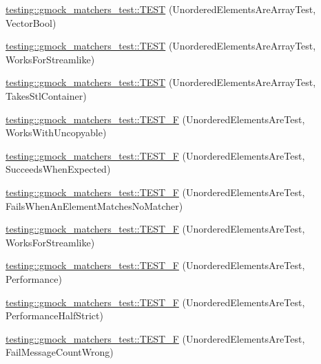 \begin{DoxyCompactItemize}
\item 
\hyperlink{namespacetesting_1_1gmock__matchers__test_a3d7df4fa0dd3e8247f4c2d4b02d801f0}{testing\+::gmock\+\_\+matchers\+\_\+test\+::\+T\+E\+ST} (Unordered\+Elements\+Are\+Array\+Test, Vector\+Bool)
\item 
\hyperlink{namespacetesting_1_1gmock__matchers__test_a1ff2a93a8f031a5b23dbc699a462043b}{testing\+::gmock\+\_\+matchers\+\_\+test\+::\+T\+E\+ST} (Unordered\+Elements\+Are\+Array\+Test, Works\+For\+Streamlike)
\item 
\hyperlink{namespacetesting_1_1gmock__matchers__test_aa3a960ec78e2b1e860c305f4598f39ec}{testing\+::gmock\+\_\+matchers\+\_\+test\+::\+T\+E\+ST} (Unordered\+Elements\+Are\+Array\+Test, Takes\+Stl\+Container)
\item 
\hyperlink{namespacetesting_1_1gmock__matchers__test_ab09132c3b991b8f104f3091370d2fe55}{testing\+::gmock\+\_\+matchers\+\_\+test\+::\+T\+E\+S\+T\+\_\+F} (Unordered\+Elements\+Are\+Test, Works\+With\+Uncopyable)
\item 
\hyperlink{namespacetesting_1_1gmock__matchers__test_a177c3db59da001df2441deb1ddb083af}{testing\+::gmock\+\_\+matchers\+\_\+test\+::\+T\+E\+S\+T\+\_\+F} (Unordered\+Elements\+Are\+Test, Succeeds\+When\+Expected)
\item 
\hyperlink{namespacetesting_1_1gmock__matchers__test_a62fd481b1160a667c785e6009ff87163}{testing\+::gmock\+\_\+matchers\+\_\+test\+::\+T\+E\+S\+T\+\_\+F} (Unordered\+Elements\+Are\+Test, Fails\+When\+An\+Element\+Matches\+No\+Matcher)
\item 
\hyperlink{namespacetesting_1_1gmock__matchers__test_a2affca2a152e4537c2f06518eaa2eac5}{testing\+::gmock\+\_\+matchers\+\_\+test\+::\+T\+E\+S\+T\+\_\+F} (Unordered\+Elements\+Are\+Test, Works\+For\+Streamlike)
\item 
\hyperlink{namespacetesting_1_1gmock__matchers__test_a074ca2babea203d1a54d69ff1fde5c59}{testing\+::gmock\+\_\+matchers\+\_\+test\+::\+T\+E\+S\+T\+\_\+F} (Unordered\+Elements\+Are\+Test, Performance)
\item 
\hyperlink{namespacetesting_1_1gmock__matchers__test_a4437de9d40efd87f73b738ef38c2d70f}{testing\+::gmock\+\_\+matchers\+\_\+test\+::\+T\+E\+S\+T\+\_\+F} (Unordered\+Elements\+Are\+Test, Performance\+Half\+Strict)
\item 
\hyperlink{namespacetesting_1_1gmock__matchers__test_a5dd3b28b540c1ef01e623f840c48e7b4}{testing\+::gmock\+\_\+matchers\+\_\+test\+::\+T\+E\+S\+T\+\_\+F} (Unordered\+Elements\+Are\+Test, Fail\+Message\+Count\+Wrong)
\item 

\end{DoxyCompactItemize}
